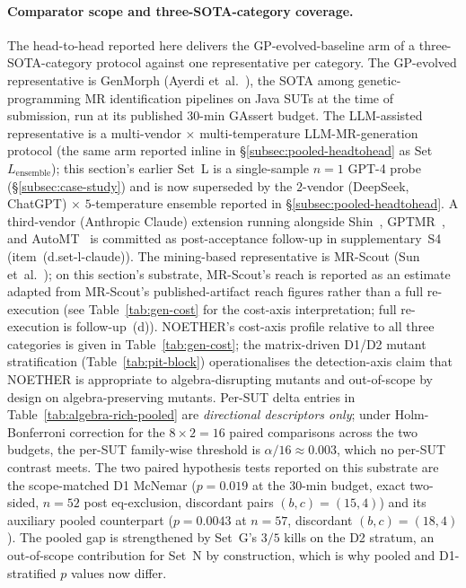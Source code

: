 \documentclass[acmsmall, screen]{acmart}
\begin{document}
\paragraph{Comparator scope and three-SOTA-category coverage.}
The head-to-head reported here delivers the GP-evolved-baseline arm
of a three-SOTA-category protocol against one representative per
category. The GP-evolved representative is GenMorph (Ayerdi
et~al.~\cite{GenMorph2024}), the SOTA among
genetic-programming MR identification pipelines on Java SUTs at the
time of submission, run at its published 30-min GAssert budget. The
LLM-assisted representative is a multi-vendor $\times$
multi-temperature LLM-MR-generation protocol (the same arm reported
inline in \S\ref{subsec:pooled-headtohead} as Set~$L_{\mathrm{ensemble}}$);
this section's earlier Set~L is a single-sample $n = 1$ GPT-4 probe
(\S\ref{subsec:case-study}) and is now superseded by the
$2$-vendor (DeepSeek, ChatGPT) $\times$ $5$-temperature ensemble
reported in \S\ref{subsec:pooled-headtohead}. A third-vendor
(Anthropic Claude) extension running alongside
Shin~\cite{Shin2024}, GPTMR~\cite{GPTMR2025}, and
AutoMT~\cite{AutoMT2025} is committed as
post-acceptance follow-up in supplementary~S4 (item~(d.set-l-claude)). The
mining-based representative is MR-Scout (Sun
et~al.~\cite{MRScout2024}); on this section's substrate, MR-Scout's
reach is reported as an estimate adapted from MR-Scout's
published-artifact reach figures rather than a full re-execution
(see Table~\ref{tab:gen-cost} for the cost-axis interpretation;
full re-execution is follow-up~(d)). NOETHER's cost-axis profile
relative to all three categories is given in
Table~\ref{tab:gen-cost}; the matrix-driven D1/D2 mutant
stratification (Table~\ref{tab:pit-block}) operationalises the
detection-axis claim that NOETHER is appropriate to algebra-disrupting
mutants and out-of-scope by design on algebra-preserving mutants.
Per-SUT delta entries in Table~\ref{tab:algebra-rich-pooled} are
\emph{directional descriptors only}; under Holm-Bonferroni
correction for the $8 \times 2 = 16$ paired comparisons across the
two budgets, the per-SUT family-wise threshold is $\alpha/16 \approx
0.003$, which no per-SUT contrast meets. The two paired hypothesis
tests reported on this substrate are the scope-matched D1 McNemar
($p = 0.019$ at the 30-min budget, exact two-sided, $n = 52$ post
eq-exclusion, discordant pairs $(b, c) = (15, 4)$) and its
auxiliary pooled counterpart ($p = 0.0043$ at $n = 57$, discordant
$(b, c) = (18, 4)$). The pooled gap is strengthened by Set~G's
$3/5$ kills on the D2 stratum, an out-of-scope contribution
for Set~N by construction, which is why pooled and D1-stratified
$p$ values now differ.
\end{document}
